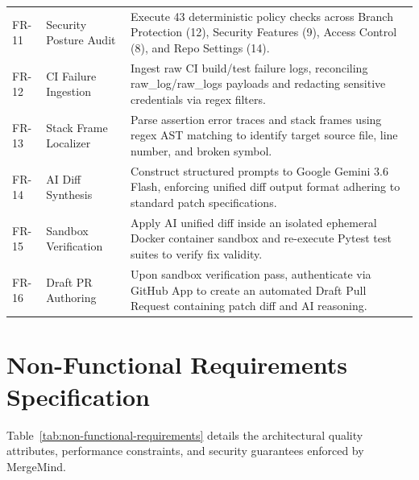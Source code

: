 \documentclass[12pt,a4paper,oneside]{report}
\begin{document}
\begin{longtable}{p{} p{} p{}}
\addlinespace
FR-11 & Security Posture Audit & Execute 43 deterministic policy checks across Branch Protection (12), Security Features (9), Access Control (8), and Repo Settings (14). \\
\addlinespace
FR-12 & CI Failure Ingestion & Ingest raw CI build/test failure logs, reconciling raw\_log/raw\_logs payloads and redacting sensitive credentials via regex filters. \\
\addlinespace
FR-13 & Stack Frame Localizer & Parse assertion error traces and stack frames using regex AST matching to identify target source file, line number, and broken symbol. \\
\addlinespace
FR-14 & AI Diff Synthesis & Construct structured prompts to Google Gemini 3.6 Flash, enforcing unified diff output format adhering to standard patch specifications. \\
\addlinespace
FR-15 & Sandbox Verification & Apply AI unified diff inside an isolated ephemeral Docker container sandbox and re-execute Pytest test suites to verify fix validity. \\
\addlinespace
FR-16 & Draft PR Authoring & Upon sandbox verification pass, authenticate via GitHub App to create an automated Draft Pull Request containing patch diff and AI reasoning. \\
\end{longtable}

\section{Non-Functional Requirements Specification}
\label{sec:non-functional-reqs}

Table~\ref{tab:non-functional-requirements} details the architectural quality attributes, performance constraints, and security guarantees enforced by MergeMind.
\end{document}
